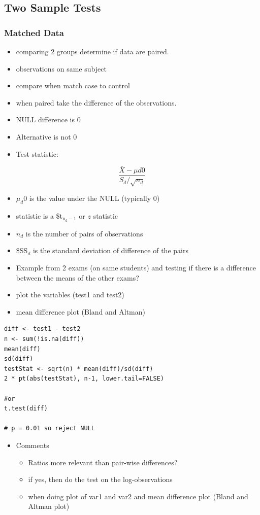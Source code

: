 \documentclass[11pt]{article}
\begin{document}
\subsection{Two Sample Tests}
\label{sec-1-4}
\subsubsection{Matched Data}
\label{sec-1-4-1}

\begin{itemize}
\item comparing 2 groups determine if data are paired.
\item observations on same subject
\item compare when match case to control
\item when paired take the difference of the observations.
\item NULL difference is 0
\item Alternative is not 0
\item Test statistic:
\end{itemize}
$$ \frac{\bar{X} - \mu{d0}}{S_d/\sqrt{n_d}} $$
\begin{itemize}
\item $\mu_d0$ is the value under the NULL (typically 0)
\item statistic is a \$t$_{\mathrm{n_d-1}}$ or $z$ statistic
\item $n_d$ is the number of pairs of observations
\item \$SS$_d$ is the standard deviation of difference of the pairs
\item Example from 2 exams (on same students) and testing if there is a
  difference between the means of the other exams?
\item plot the variables (test1 and test2)
\item mean difference plot (Bland and Altman)
\end{itemize}


\begin{verbatim}
diff <- test1 - test2
n <- sum(!is.na(diff))
mean(diff)
sd(diff)
testStat <- sqrt(n) * mean(diff)/sd(diff)
2 * pt(abs(testStat), n-1, lower.tail=FALSE)

#or
t.test(diff)

# p = 0.01 so reject NULL
\end{verbatim}
\begin{itemize}

\item Comments
\label{sec-1-4-1-1}%
\begin{itemize}
\item Ratios more relevant than pair-wise differences?
\item if yes, then do the test on the log-observations
\item when doing plot of var1 and var2 and mean difference plot (Bland
  and Altman plot)
\end{itemize}

\end{itemize} %
\end{document}
